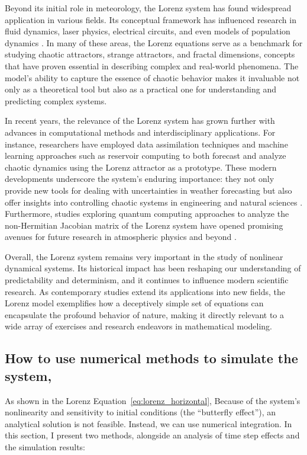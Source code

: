 Beyond its initial role in meteorology, the Lorenz system has found widespread application in various fields. Its conceptual framework has influenced research in fluid dynamics, laser physics, electrical circuits, and even models of population dynamics \cite{kashyap2024lorenz}. In many of these areas, the Lorenz equations serve as a benchmark for studying chaotic attractors, strange attractors, and fractal dimensions, concepts that have proven essential in describing complex and real-world phenomena. The model’s ability to capture the essence of chaotic behavior makes it invaluable not only as a theoretical tool but also as a practical one for understanding and predicting complex systems.

In recent years, the relevance of the Lorenz system has grown further with advances in computational methods and interdisciplinary applications. For instance, researchers have employed data assimilation techniques and machine learning approaches such as reservoir computing to both forecast and analyze chaotic dynamics using the Lorenz attractor as a prototype. These modern developments underscore the system’s enduring importance: they not only provide new tools for dealing with uncertainties in weather forecasting but also offer insights into controlling chaotic systems in engineering and natural sciences \cite{Pathak_2017}. Furthermore, studies exploring quantum computing approaches to analyze the non-Hermitian Jacobian matrix of the Lorenz system have opened promising avenues for future research in atmospheric physics and beyond \cite{armaos2024quantumcomputingatmosphericdynamics}.

Overall, the Lorenz system remains very important in the study of nonlinear dynamical systems. Its historical impact has been reshaping our understanding of predictability and determinism, and it continues to influence modern scientific research. As contemporary studies extend its applications into new fields, the Lorenz model exemplifies how a deceptively simple set of equations can encapsulate the profound behavior of nature, making it directly relevant to a wide array of exercises and research endeavors in mathematical modeling.

\subsection{How to use numerical methods to simulate the system, }
As shown in the Lorenz Equation~\ref{eq:lorenz_horizontal}, Because of the system’s nonlinearity and sensitivity to initial conditions (the “butterfly effect”), an analytical solution is not feasible. Instead, we can use numerical integration. In this section, I present two methods, alongside an analysis of time step effects and the simulation results:

